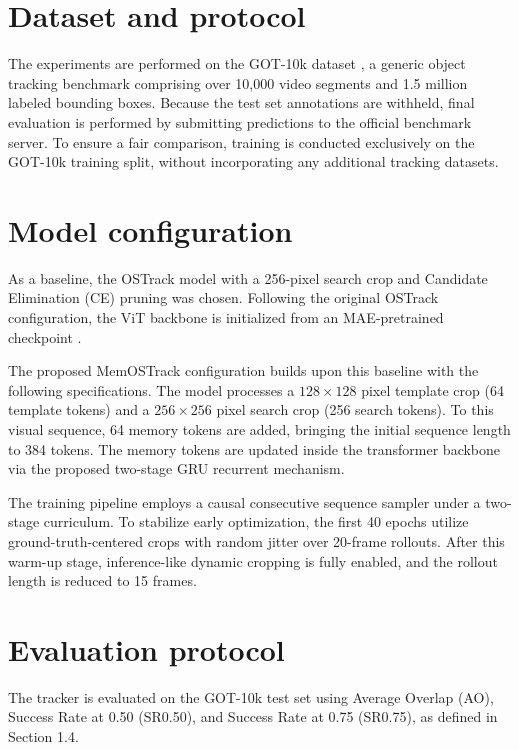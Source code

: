 \documentclass[bachelorthesis]{fer}
\numberwithin{equation}{chapter}
\begin{document}
    \section{Dataset and protocol}\label{dataset-and-protocol}

    The experiments are performed on the GOT-10k dataset \cite{huang2021got10k}, a generic object tracking benchmark comprising over 10,000 video segments and 1.5 million labeled bounding boxes. Because the test set annotations are withheld, final evaluation is performed by submitting predictions to the official benchmark server. To ensure a fair comparison, training is conducted exclusively on the GOT-10k training split, without incorporating any additional tracking datasets.


    \section{Model configuration}\label{model-configuration}

    As a baseline, the OSTrack model with a 256-pixel search crop and Candidate Elimination (CE) pruning was chosen.
    Following the original OSTrack configuration, the ViT backbone is initialized from an MAE-pretrained checkpoint \cite{he2022mae}.

    The proposed MemOSTrack configuration builds upon this baseline with the following specifications. The model processes
    a \(128 \times 128\) pixel template crop (64 template tokens) and a \(256 \times 256\) pixel search crop
    (256 search tokens). To this visual sequence, 64 memory tokens are added, bringing the initial sequence length
    to 384 tokens. The memory tokens are updated inside the transformer backbone via the proposed two-stage GRU recurrent mechanism.

    The training pipeline employs a causal consecutive sequence sampler under a two-stage curriculum. To stabilize early
    optimization, the first 40 epochs utilize ground-truth-centered crops with random jitter over 20-frame rollouts.
    After this warm-up stage, inference-like dynamic cropping is fully enabled, and the rollout length is reduced to 15 frames.


    \section{Evaluation protocol}\label{evaluation-protocol}

    The tracker is evaluated on the GOT-10k test set using Average Overlap (AO), Success Rate at 0.50 (SR0.50), and Success
    Rate at 0.75 (SR0.75), as defined in Section 1.4.
\end{document}

